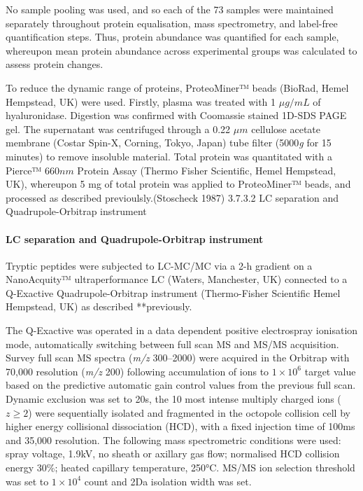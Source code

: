\documentclass[9pt,lineno]{elife}
\begin{document}
No sample pooling was used, and so each of the 73 samples were maintained separately throughout protein equalisation, mass spectrometry, and label-free quantification steps.
Thus, protein abundance was quantified for each sample, whereupon mean protein abundance across experimental groups was calculated to assess protein changes.

To reduce the dynamic range of proteins, ProteoMiner™ beads (BioRad, Hemel Hempstead, UK) were used. Firstly, plasma was treated with 1 \(\mu g/mL\) of hyaluronidase. Digestion was confirmed with Coomassie stained 1D-SDS PAGE gel.
The supernatant was centrifuged through a 0.22 \(\mu m\) cellulose acetate membrane (Costar Spin-X, Corning, Tokyo, Japan) tube filter (5000\emph{g} for 15 minutes) to remove insoluble material.
Total protein was quantitated with a Pierce™ \(660 nm\) Protein Assay (Thermo Fisher Scientific, Hemel Hempstead, UK), whereupon 5 mg of total protein was applied to ProteoMiner™ beads, and processed as described previoulsly.(Stoscheck 1987)
3.7.3.2 LC separation and Quadrupole-Orbitrap instrument

\hypertarget{lc-separation-and-quadrupole-orbitrap-instrument}{%
\paragraph{LC separation and Quadrupole-Orbitrap instrument}\label{lc-separation-and-quadrupole-orbitrap-instrument}}

Tryptic peptides were subjected to LC-MC/MC via a 2-h gradient on a NanoAcquity™ ultraperformance LC (Waters, Manchester, UK) connected to a Q-Exactive Quadrupole-Orbitrap instrument (Thermo-Fisher Scientific Hemel Hempstead, UK) as described **previously.

The Q-Exactive was operated in a data dependent positive electrospray ionisation mode, automatically switching between full scan MS and MS/MS acquisition.
Survey full scan MS spectra (\emph{m/z} 300--2000) were acquired in the Orbitrap with 70,000 resolution (\emph{m/z} 200) following accumulation of ions to \(1\times 10^6\) target value based on the predictive automatic gain control values from the previous full scan.
Dynamic exclusion was set to 20s, the 10 most intense multiply charged ions (\(z \geq 2\)) were sequentially isolated and fragmented in the octopole collision cell by higher energy collisional dissociation (HCD), with a fixed injection time of 100ms and 35,000 resolution.
The following mass spectrometric conditions were used: spray voltage, 1.9kV, no sheath or axillary gas flow; normalised HCD collision energy 30\%; heated capillary temperature, 250°C.
MS/MS ion selection threshold was set to \(1\times 10^4\) count and 2Da isolation width was set.
\end{document}
